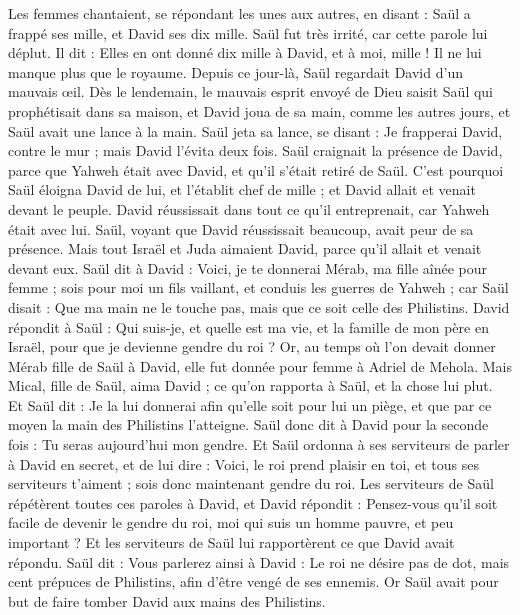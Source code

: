 \begin{multicols}{2}
Les femmes chantaient, se répondant les unes aux autres, en disant : Saül a frappé ses mille, et David ses dix mille.
Saül fut très irrité, car cette parole lui déplut. Il dit : Elles en ont donné dix mille à David, et à moi, mille ! Il ne lui manque plus que le royaume.
Depuis ce jour-là, Saül regardait David d’un mauvais œil.
Dès le lendemain, le mauvais esprit envoyé de Dieu saisit Saül qui prophétisait dans sa maison, et David joua de sa main, comme les autres jours, et Saül avait une lance à la main.
Saül jeta sa lance, se disant : Je frapperai David, contre le mur ; mais David l’évita deux fois.
Saül craignait la présence de David, parce que Yahweh était avec David, et qu'il s'était retiré de Saül.
C'est pourquoi Saül éloigna David de lui, et l'établit chef de mille ; et David allait et venait devant le peuple.
David réussissait dans tout ce qu'il entreprenait, car Yahweh était avec lui.
Saül, voyant que David réussissait beaucoup, avait peur de sa présence.
Mais tout Israël et Juda aimaient David, parce qu'il allait et venait devant eux.
Saül dit à David : Voici, je te donnerai Mérab, ma fille aînée pour femme ; sois pour moi un fils vaillant, et conduis les guerres de Yahweh ; car Saül disait : Que ma main ne le touche pas, mais que ce soit celle des Philistins.
David répondit à Saül : Qui suis-je, et quelle est ma vie, et la famille de mon père en Israël, pour que je devienne gendre du roi ?
Or, au temps où l’on devait donner Mérab fille de Saül à David, elle fut donnée pour femme à Adriel de Mehola.
Mais Mical, fille de Saül, aima David ; ce qu'on rapporta à Saül, et la chose lui plut.
Et Saül dit : Je la lui donnerai afin qu'elle soit pour lui un piège, et que par ce moyen la main des Philistins l’atteigne. Saül donc dit à David pour la seconde fois : Tu seras aujourd'hui mon gendre.
Et Saül ordonna à ses serviteurs de parler à David en secret, et de lui dire : Voici, le roi prend plaisir en toi, et tous ses serviteurs t'aiment ; sois donc maintenant gendre du roi.
Les serviteurs de Saül répétèrent toutes ces paroles à David, et David répondit : Pensez-vous qu’il soit facile de devenir le gendre du roi, moi qui suis un homme pauvre, et peu important ?
Et les serviteurs de Saül lui rapportèrent ce que David avait répondu.
Saül dit : Vous parlerez ainsi à David : Le roi ne désire pas de dot, mais cent prépuces de Philistins, afin d’être vengé de ses ennemis. Or Saül avait pour but de faire tomber David aux mains des Philistins.

\end{multicols}
